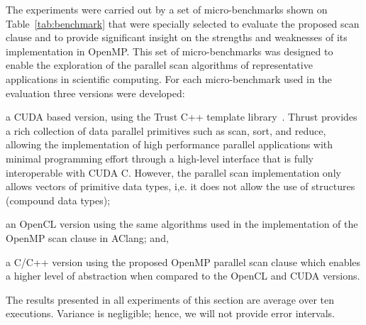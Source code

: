\documentclass[Ingles]{ic-tese-v1}
\begin{document}
The experiments were carried out by a set of micro-benchmarks
shown on  Table~\ref{tab:benchmark} that were specially selected to  evaluate
the  proposed scan clause  and to  provide significant
insight on the strengths and weaknesses of its  implementation in OpenMP.
This set of  micro-benchmarks was designed to  enable the exploration
of  the  parallel scan  algorithms  of  representative applications  in
scientific computing.  For each micro-benchmark  used  in   the  evaluation
three  versions  were developed:
\begin{inparaenum}[(i)\upshape]
	\item a CUDA based version, using the Trust C++ template library~\cite{trust}.
	Thrust provides a  rich collection of data  parallel primitives such
	as scan,  sort, and reduce,  allowing the implementation of  high performance
	parallel  applications with  minimal  programming  effort through  a
	high-level  interface   that  is   fully  interoperable   with  CUDA
	C. However, the parallel scan  implementation only allows vectors of
	primitive  data  types, i,e.   it  does  not  allow the  use  of
	structures (compound data types);
	\item an  OpenCL version using the same algorithms used in the
	implementation of the OpenMP scan clause in AClang; and,
	\item a C/C++ version using the proposed OpenMP parallel scan clause
	which enables a  higher level of abstraction when compared to the OpenCL and
	CUDA versions.
\end{inparaenum}

The results presented  in all experiments of this  section are average
over  ten  executions. Variance  is  negligible;  hence, we  will  not
provide error intervals.
\end{document}
